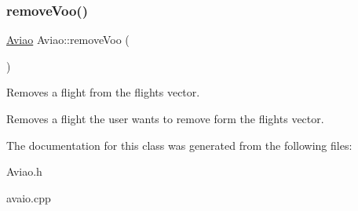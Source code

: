 \subsubsection{\texorpdfstring{remove\+Voo()}{removeVoo()}}
{\footnotesize\ttfamily \hyperlink{class_aviao}{Aviao} Aviao\+::remove\+Voo (\begin{DoxyParamCaption}{ }\end{DoxyParamCaption})}



Removes a flight from the flights vector. 

Removes a flight the user wants to remove form the flights vector. 

The documentation for this class was generated from the following files\+:\begin{DoxyCompactItemize}
\item 
Aviao.\+h\item 
avaio.\+cpp\end{DoxyCompactItemize}
